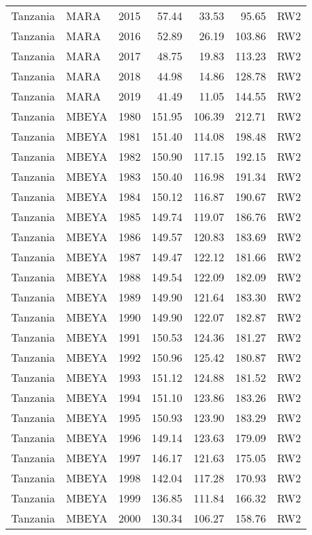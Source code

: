 \begin{longtable}{lllrrrl}
  Tanzania & MARA & 2015 & 57.44 & 33.53 & 95.65 & RW2 \\ 
  Tanzania & MARA & 2016 & 52.89 & 26.19 & 103.86 & RW2 \\ 
  Tanzania & MARA & 2017 & 48.75 & 19.83 & 113.23 & RW2 \\ 
  Tanzania & MARA & 2018 & 44.98 & 14.86 & 128.78 & RW2 \\ 
  Tanzania & MARA & 2019 & 41.49 & 11.05 & 144.55 & RW2 \\ 
  Tanzania & MBEYA & 1980 & 151.95 & 106.39 & 212.71 & RW2 \\ 
  Tanzania & MBEYA & 1981 & 151.40 & 114.08 & 198.48 & RW2 \\ 
  Tanzania & MBEYA & 1982 & 150.90 & 117.15 & 192.15 & RW2 \\ 
  Tanzania & MBEYA & 1983 & 150.40 & 116.98 & 191.34 & RW2 \\ 
  Tanzania & MBEYA & 1984 & 150.12 & 116.87 & 190.67 & RW2 \\ 
  Tanzania & MBEYA & 1985 & 149.74 & 119.07 & 186.76 & RW2 \\ 
  Tanzania & MBEYA & 1986 & 149.57 & 120.83 & 183.69 & RW2 \\ 
  Tanzania & MBEYA & 1987 & 149.47 & 122.12 & 181.66 & RW2 \\ 
  Tanzania & MBEYA & 1988 & 149.54 & 122.09 & 182.09 & RW2 \\ 
  Tanzania & MBEYA & 1989 & 149.90 & 121.64 & 183.30 & RW2 \\ 
  Tanzania & MBEYA & 1990 & 149.90 & 122.07 & 182.87 & RW2 \\ 
  Tanzania & MBEYA & 1991 & 150.53 & 124.36 & 181.27 & RW2 \\ 
  Tanzania & MBEYA & 1992 & 150.96 & 125.42 & 180.87 & RW2 \\ 
  Tanzania & MBEYA & 1993 & 151.12 & 124.88 & 181.52 & RW2 \\ 
  Tanzania & MBEYA & 1994 & 151.10 & 123.86 & 183.26 & RW2 \\ 
  Tanzania & MBEYA & 1995 & 150.93 & 123.90 & 183.29 & RW2 \\ 
  Tanzania & MBEYA & 1996 & 149.14 & 123.63 & 179.09 & RW2 \\ 
  Tanzania & MBEYA & 1997 & 146.17 & 121.63 & 175.05 & RW2 \\ 
  Tanzania & MBEYA & 1998 & 142.04 & 117.28 & 170.93 & RW2 \\ 
  Tanzania & MBEYA & 1999 & 136.85 & 111.84 & 166.32 & RW2 \\ 
  Tanzania & MBEYA & 2000 & 130.34 & 106.27 & 158.76 & RW2 \\ 

\end{longtable}
